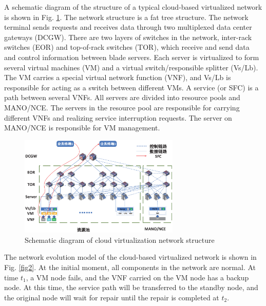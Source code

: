 \documentclass[journal]{IEEEtran}
\begin{document}
    A schematic diagram of the structure of a typical cloud-based virtualized network is shown in Fig. \ref{fig1}.
    The network structure is a fat tree structure. The network terminal sends requests and receives data through two
    multiplexed data center gateways (DCGW). There are two layers of switches in the network, inter-rack switches (EOR)
    and top-of-rack switches (TOR), which receive and send data and control information between blade servers. Each
    server is virtualized to form several virtual machines (VM) and a virtual switch/responsible splitter (Vs/Lb).
    The VM carries a special virtual network function (VNF), and Vs/Lb is responsible for acting as a switch between
    different VMs. A service (or SFC) is a path between several VNFs. All servers are divided into resource pools and
    MANO/NCE. The servers in the resource pool are responsible for carrying different VNFs and realizing service
    interruption requests. The server on MANO/NCE is responsible for VM management.

    \begin{figure}[!t]
        \begin{center}
            \includegraphics[width = 3in]{img/1.eps}
            \caption{Schematic diagram of cloud virtualization network structure}
            \label{fig1}
        \end{center}
    \end{figure}

    The network evolution model of the cloud-based virtualized network is shown in Fig. \ref{fig2}. At the initial moment, all components in the network are normal. At time $t_1$, a VM node fails, and the VNF carried on the VM node has a backup node. At this time, the service path will be transferred to the standby node, and the original node will wait for repair until the repair is completed at $t_2$.
\end{document}
